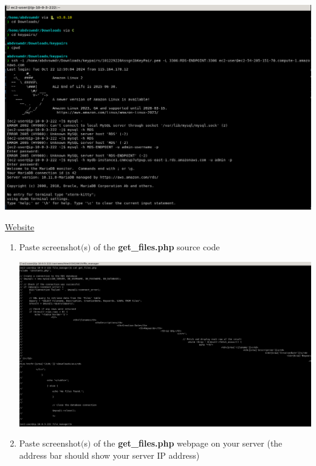 \documentclass[11pt]{article}
\begin{document}
\begin{enumerate}[resume]
    {\centering
    \includegraphics[width=5.8in]{pics/37b.png}
    }
\end{enumerate}

\vspace{0.2cm}

\newpage
\noindent\underline{Website}

\begin{enumerate}[resume]
    \item Paste screenshot$($s$)$ of the \textbf{get\_files.php} source code \\
    \vspace{-0.02mm}

    {\centering
    \includegraphics[width=5.8in]{pics/38.png}
    }
    
    \item Paste screenshot$($s$)$ of the \textbf{get\_files.php} webpage on your server (the address bar should show your server IP address)\\
    \vspace{5mm}


        
\end{enumerate}
\end{document}
